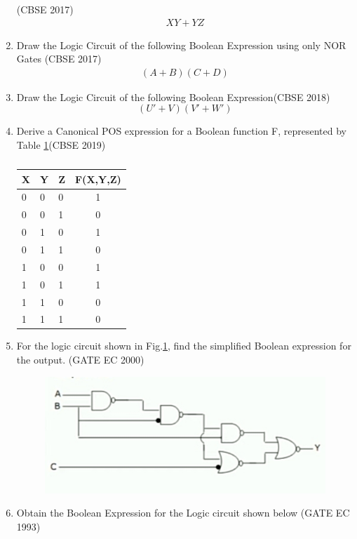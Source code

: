 \begin{enumerate}
\hfill (CBSE 2017)
\label{prob:2017-1/c/6/b}
		\begin{align}
\label{eq:2017-1/c/6/b}
 XY + YZ
		\end{align}
\item Draw the Logic Circuit of the following Boolean Expression using only NOR Gates  
\hfill (CBSE 2017)
\label{prob:2017/c/6/b}
      \begin{align}
      (A+B)(C+D)
      \end{align}
\item Draw the Logic Circuit of the following Boolean Expression\hfill (CBSE 2018)
\begin{equation} 
(U'+V)(V'+W')
\end{equation}
\label{prob:2018/c/6/b}
\item Derive a Canonical POS expression for a Boolean function F, represented by 
Table \ref{tab:2019/c/6/c}\hfill (CBSE 2019)
\label{prob:2019/c/6/c}
\begin{table}[H]
\centering
\begin{tabular}{|l|l|l|c|}
	\hline
	X&Y&Z&F(X,Y,Z)\\
	\hline
	0&0&0&1\\
	0&0&1&0\\
	0&1&0&1\\
	0&1&1&0\\
	1&0&0&1\\
	1&0&1&1\\
	1&1&0&0\\
	1&1&1&0\\
	\hline
\end{tabular}
\caption{}
\label{tab:2019/c/6/c}
\end{table}
\item For the logic circuit shown in Fig.\ref{fig:2000/gate/ec/2/7}, find the simplified Boolean expression for the output. 
\label{prob:2000/gate/ec/2/7}
\hfill (GATE EC 2000)
\begin{figure}[H]
    \centering
    \includegraphics[width=\columnwidth]{figs/2000-gate-ec-2-7.jpg}
    \caption{}
\label{fig:2000/gate/ec/2/7}
\end{figure}
\item 
Obtain the Boolean Expression for the Logic circuit shown below
\label{prob:1993/gate/ec/4/8}
\hfill (GATE EC 1993)
	  	

\end{enumerate}

